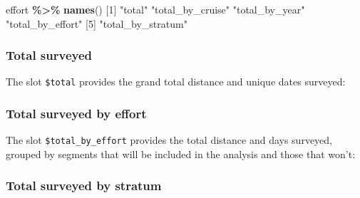 \documentclass[
]{book}
\newenvironment{Shaded}{\begin{snugshade}}{\end{snugshade}}
\newcommand{\AttributeTok}[1]{\textcolor[rgb]{0.13,0.29,0.53}{#1}}
\newcommand{\DecValTok}[1]{\textcolor[rgb]{0.00,0.00,0.81}{#1}}
\newcommand{\FunctionTok}[1]{\textcolor[rgb]{0.13,0.29,0.53}{\textbf{#1}}}
\newcommand{\NormalTok}[1]{#1}
\newcommand{\SpecialCharTok}[1]{\textcolor[rgb]{0.81,0.36,0.00}{\textbf{#1}}}
\newcommand{\StringTok}[1]{\textcolor[rgb]{0.31,0.60,0.02}{#1}}
\begin{document}
\begin{Shaded}
\begin{Highlighting}[]
\NormalTok{effort }\SpecialCharTok{\%\textgreater{}\%}  \FunctionTok{names}\NormalTok{()}
\NormalTok{[}\DecValTok{1}\NormalTok{] }\StringTok{"total"}            \StringTok{"total\_by\_cruise"}  \StringTok{"total\_by\_year"}    \StringTok{"total\_by\_effort"} 
\NormalTok{[}\DecValTok{5}\NormalTok{] }\StringTok{"total\_by\_stratum"}
\end{Highlighting}
\end{Shaded}

\hypertarget{total-surveyed}{%
\subsubsection*{Total surveyed}\label{total-surveyed}}

The slot \texttt{\$total} provides the grand total distance and unique dates surveyed:

\begin{Shaded}
\end{Shaded}

\hypertarget{total-surveyed-by-effort}{%
\subsubsection*{Total surveyed by effort}\label{total-surveyed-by-effort}}

The slot \texttt{\$total\_by\_effort} provides the total distance and days surveyed, grouped by segments that will be included in the analysis and those that won't:

\hypertarget{total-surveyed-by-stratum}{%
\subsubsection*{Total surveyed by stratum}\label{total-surveyed-by-stratum}}
\end{document}
